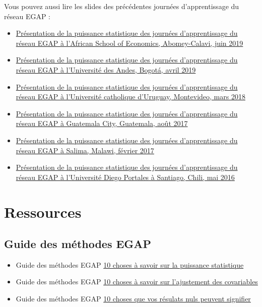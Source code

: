 \documentclass[
  12pt,
]{book}
\begin{document}
Vous pouvez aussi lire les slides des précédentes journées d'apprentissage du réseau EGAP :

\begin{itemize}
\item
  \href{https://egap.github.io/learningdays-resources/Slides/Examples/power-benin.pdf}{Présentation de la puissance statistique des journées d'apprentissage du réseau EGAP à l'African School of Economics, Abomey-Calavi, juin 2019}
\item
  \href{https://egap.github.io/learningdays-resources/Slides/Examples/power-bogota.pdf}{Présentation de la puissance statistique des journées d'apprentissage du réseau EGAP à l'Université des Andes, Bogotá, avril 2019}
\item
  \href{https://egap.github.io/learningdays-resources/Slides/Examples/power-montevideo.pdf}{Présentation de la puissance statistique des journées d'apprentissage du réseau EGAP à l'Université catholique d'Uruguay, Montevideo, mars 2018}
\item
  \href{https://egap.github.io/learningdays-resources/Slides/Examples/power-guatemala.html}{Présentation de la puissance statistique des journées d'apprentissage du réseau EGAP à Guatemala City, Guatemala, août 2017}
\item
  \href{https://egap.github.io/learningdays-resources/Slides/Examples/power-malawi.pdf}{Présentation de la puissance statistique des journées d'apprentissage du réseau EGAP à Salima, Malawi, février 2017}
\item
  \href{https://egap.github.io/learningdays-resources/Slides/Examples/power-santiago.pdf}{Présentation de la puissance statistique des journées d'apprentissage du réseau EGAP à l'Université Diego Portales à Santiago, Chili, mai 2016}
\end{itemize}

\hypertarget{ressources-5}{%
\section{Ressources}\label{ressources-5}}

\hypertarget{guide-des-muxe9thodes-egap-5}{%
\subsection{Guide des méthodes EGAP}\label{guide-des-muxe9thodes-egap-5}}

\begin{itemize}
\item
  Guide des méthodes EGAP \href{https://egap.org/resource/10-things-you-need-know-about-statistical-power/}{10 choses à savoir sur la puissance statistique}
\item
  Guide des méthodes EGAP \href{https://egap.org/resource/10-things-to-know-about-covariate-adjustment/}{10 choses à savoir sur l'ajustement des covariables}
\item
  Guide des méthodes EGAP \href{https://egap.org/resource/10-things-your-null-result-might-mean/}{10 choses que vos résulats nuls peuvent signifier}
\end{itemize}
\end{document}
